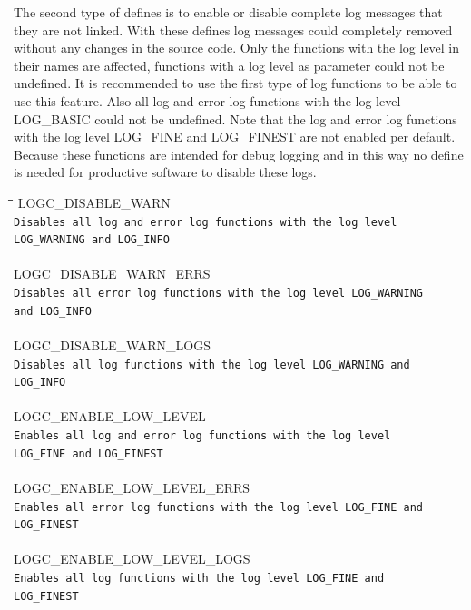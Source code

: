 \documentclass[a4paper, titlepage, 11pt]{article}
\begin{document}
The second type of defines is to enable or disable complete log messages that
they are not linked. With these defines log messages could completely removed
without any changes in the source code. Only the functions with the log level in
their names are affected, functions with a log level as parameter could not be
undefined. It is recommended to use the first type of log functions to be able
to use this feature. Also all log and error log functions with the log level
LOG\_BASIC could not be undefined. Note that the log and error log functions
with the log level LOG\_FINE and LOG\_FINEST are not enabled per default.
Because these functions are intended for debug logging and in this way no define is needed for productive software to disable these logs.

\begin{tabbing}
\hspace*{1cm}\=\hspace*{2cm}\=\hspace*{0,6cm}\= \kill
\> LOGC\_DISABLE\_WARN \\
\> \small\verb+Disables all log and error log functions with the log level+ \\
\> \small\verb+LOG_WARNING and LOG_INFO+ \\ \\

\> LOGC\_DISABLE\_WARN\_ERRS \\
\> \small\verb+Disables all error log functions with the log level LOG_WARNING+ \\
\> \small\verb+and LOG_INFO+ \\ \\

\> LOGC\_DISABLE\_WARN\_LOGS \\
\> \small\verb+Disables all log functions with the log level LOG_WARNING and+ \\
\> \small\verb+LOG_INFO+ \\ \\

\> LOGC\_ENABLE\_LOW\_LEVEL \\
\> \small\verb+Enables all log and error log functions with the log level+ \\
\> \small\verb+LOG_FINE and LOG_FINEST+ \\ \\

\> LOGC\_ENABLE\_LOW\_LEVEL\_ERRS \\
\> \small\verb+Enables all error log functions with the log level LOG_FINE and+ \\
\> \small\verb+LOG_FINEST+ \\ \\

\> LOGC\_ENABLE\_LOW\_LEVEL\_LOGS \\
\> \small\verb+Enables all log functions with the log level LOG_FINE and+ \\
\> \small\verb+LOG_FINEST+
\end{tabbing}
\end{document}
